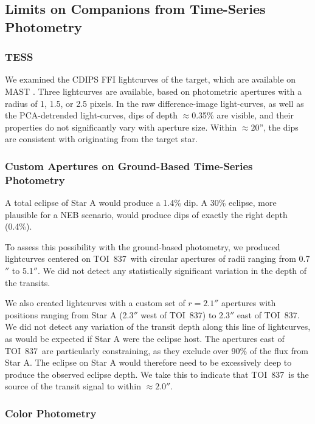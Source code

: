 \documentclass[12pt,twocolumn,tighten]{aastex62}
\newcommand{\tn}{TOI~837} %
\begin{document}
\subsection{Limits on Companions from Time-Series Photometry}

\subsubsection{TESS}
We examined the CDIPS FFI lightcurves of the target, which are
available on MAST \citep{bouma_cluster_2019}. Three lightcurves are
available, based on photometric apertures with a radius of 1, 1.5, or
2.5 pixels.  In the raw difference-image light-curves, as well as the
PCA-detrended light-curves, dips of depth $\approx$0.35\% are visible,
and their properties do not significantly vary with aperture size.
Within $\approx20$'', the dips are consistent with originating from
the target star.

\subsubsection{Custom Apertures on Ground-Based Time-Series Photometry}

A total eclipse of Star A would produce a 1.4\%
dip. A 30\% eclipse, more plausible for a NEB scenario, would produce
dips of exactly the right depth (0.4\%).

To assess this possibility with the ground-based photometry, we
produced lightcurves centered on \tn\ with
circular apertures of radii ranging from 0.7$''$ to 5.1$''$.
We did not detect any statistically significant variation in the depth
of the transits.

We also created lightcurves with a custom set of $r=2.1''$ apertures
with positions ranging from Star A (2.3$''$ west of \tn) to 2.3$''$
east of \tn.  We did not detect any variation of the transit depth
along this line of lightcurves, as would be expected if Star A were
the eclipse host.  The apertures east of \tn\ are particularly
constraining, as they exclude over 90\% of the flux from Star A.
The eclipse on Star A would therefore need to be excessively deep to
produce the observed eclipse depth.
We take this to indicate that \tn\ is the source of the transit signal
to within $\approx2.0''$.

\newpage
\subsubsection{Color Photometry}
\end{document}
